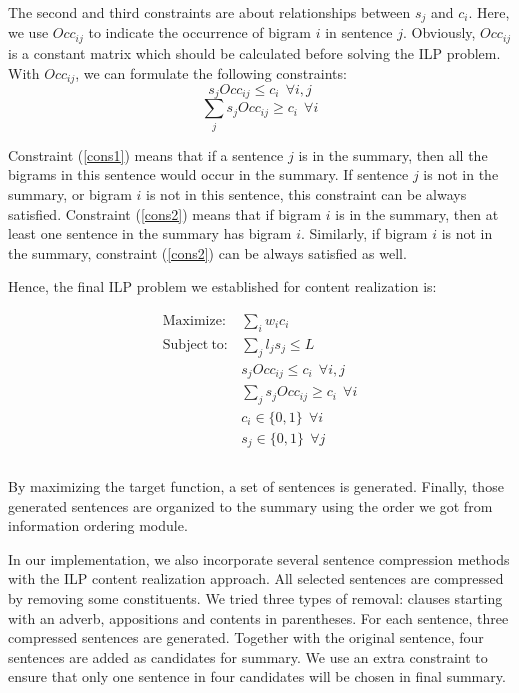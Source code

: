 \documentclass[11pt]{article}
\begin{document}
The second and third constraints are about relationships between $s_j$ and $c_i$. Here, we use $Occ_{ij}$ to indicate the occurrence of bigram $i$ in sentence $j$. Obviously, $Occ_{ij}$ is a constant matrix which should be calculated before solving the ILP problem. With $Occ_{ij}$, we can formulate the following constraints:
\begin{equation}
	s_jOcc_{ij} \leq c_i\ \  \forall i,j\label{cons1}
\end{equation}
\begin{equation}
	\sum_j s_jOcc_{ij} \geq c_i\ \  \forall i\label{cons2}
\end{equation}

Constraint (\ref{cons1}) means that if a sentence $j$ is in the summary, then all the bigrams in this sentence would occur in the summary. If sentence $j$ is not in the summary, or bigram $i$ is not in this sentence, this constraint can be always satisfied. Constraint (\ref{cons2}) means that if bigram $i$ is in the summary, then at least one sentence in the summary has bigram $i$. Similarly, if bigram $i$ is not in the summary, constraint (\ref{cons2}) can be always satisfied as well.

Hence, the final ILP problem we established for content realization is:

\begin{equation}
	\begin{aligned}
	\mathrm{Maximize:} & \sum_i{w_ic_i} \\
	\mathrm{Subject\ to:} & \sum_j{l_js_j} \leq L \\
 	& s_jOcc_{ij} \leq c_i\ \ \forall i,j\\
	& \sum_j s_jOcc_{ij} \geq c_i\ \ \forall i \\
	& c_i \in \{0,1\}\ \ \forall i \\
	& s_j \in \{0,1\}\ \ \forall j \\
	\end{aligned}
\end{equation}
\\
\indent
By maximizing the target function, a set of sentences is generated. Finally, those generated sentences are organized to the summary using the order we got from information ordering module.

In our implementation, we also incorporate several sentence compression methods with the ILP content realization approach. All selected sentences are compressed by removing some constituents. We tried three types of removal: clauses starting with an adverb, appositions and contents in parentheses. For each sentence, three compressed sentences are generated. Together with the original sentence, four sentences are added as candidates for summary. We use an extra constraint to ensure that only one sentence in four candidates will be chosen in final summary. 
\end{document}
